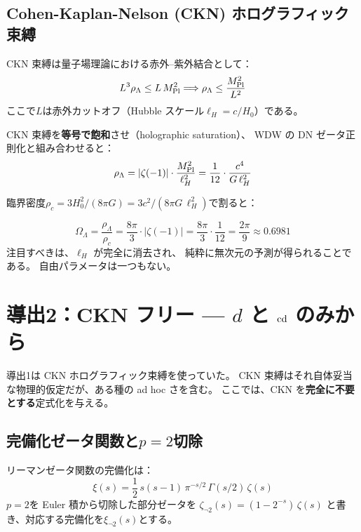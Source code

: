 \subsection{Cohen-Kaplan-Nelson (CKN) ホログラフィック束縛}

CKN 束縛は量子場理論における赤外--紫外結合として：
\begin{equation}
L^3 \rho_\Lambda \leq L\,M_{\mathrm{Pl}}^2
\Longrightarrow
\rho_\Lambda \leq \frac{M_{\mathrm{Pl}}^2}{L^2}
\end{equation}
ここで$L$は赤外カットオフ（Hubble スケール$\ell_H = c/H_0$）である。

CKN 束縛を\textbf{等号で飽和}させ（holographic saturation）、
WDW の DN ゼータ正則化と組み合わせると：
\begin{equation}
\rho_\Lambda = |\zeta(-1)| \cdot \frac{M_{\mathrm{Pl}}^2}{\ell_H^2}
= \frac{1}{12}\cdot\frac{c^4}{G\,\ell_H^2}
\end{equation}

臨界密度$\rho_c = 3H_0^2/(8\pi G) = 3c^2/(8\pi G\,\ell_H^2)$で割ると：

\begin{keyresult}
\begin{equation}
\Omega_\Lambda = \frac{\rho_\Lambda}{\rho_c}
= \frac{8\pi}{3}\cdot|\zeta(-1)|
= \frac{8\pi}{3}\cdot\frac{1}{12}
= \frac{2\pi}{9}
\approx 0.6981
\end{equation}
注目すべきは、$\ell_H$ が完全に消去され、
純粋に無次元の予測が得られることである。
自由パラメータは一つもない。
\end{keyresult}

\section{導出2：CKN フリー — $d$ と $\operatorname{cd}$ のみから}
\label{sec:DE-CKNfree}

導出1は CKN ホログラフィック束縛を使っていた。
CKN 束縛はそれ自体妥当な物理的仮定だが、ある種の ad hoc さを含む。
ここでは、CKN を\textbf{完全に不要とする}定式化を与える。

\subsection{完備化ゼータ関数と$p=2$切除}

リーマンゼータ関数の完備化は：
\begin{equation}
\xi(s) = \frac{1}{2}\,s(s-1)\,\pi^{-s/2}\,\Gamma(s/2)\,\zeta(s)
\end{equation}
$p=2$を Euler 積から切除した部分ゼータを
$\zeta_{\neg 2}(s) = (1-2^{-s})\,\zeta(s)$
と書き、対応する完備化を$\xi_{\neg 2}(s)$とする。

